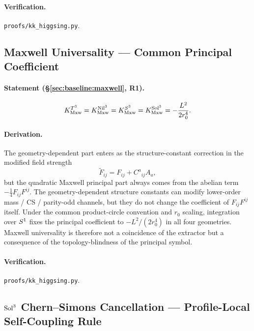 \paragraph{Verification.}
\texttt{proofs/kk\_higgsing.py}.

\subsection{Maxwell Universality --- Common Principal Coefficient}
\label{app:E:E2b}

\paragraph{Statement (\S\ref{sec:baseline:maxwell}, R1).}
\begin{equation}
  K_{\mathrm{Mxw}}^{T^3} = K_{\mathrm{Mxw}}^{\mathrm{Nil}^3} = K_{\mathrm{Mxw}}^{S^3} = K_{\mathrm{Mxw}}^{\mathrm{Sol}^3}
  = -\frac{L^2}{2 r_0^4}.
\end{equation}

\paragraph{Derivation.}
The geometry-dependent part enters as the structure-constant correction in
the modified field strength
\begin{equation}
  \tilde{F}_{ij} = F_{ij} + C^a{}_{ij}A_a,
\end{equation}
but the quadratic Maxwell principal part always comes from the abelian term
$-\tfrac{1}{4}F_{ij}F^{ij}$.  The geometry-dependent structure constants can
modify lower-order mass / CS / parity-odd channels, but they do not change
the coefficient of $F_{ij}F^{ij}$ itself.  Under the common product-circle
convention and $r_0$ scaling, integration over $S^1$ fixes the principal
coefficient to $-L^2/(2 r_0^4)$ in all four geometries.  Maxwell
universality is therefore not a coincidence of the extractor but a
consequence of the topology-blindness of the principal symbol.

\paragraph{Verification.}
\texttt{proofs/kk\_higgsing.py}.

\subsection{$\mathrm{Sol}^3$ Chern--Simons Cancellation --- Profile-Local
Self-Coupling Rule}
\label{app:E:E3}

